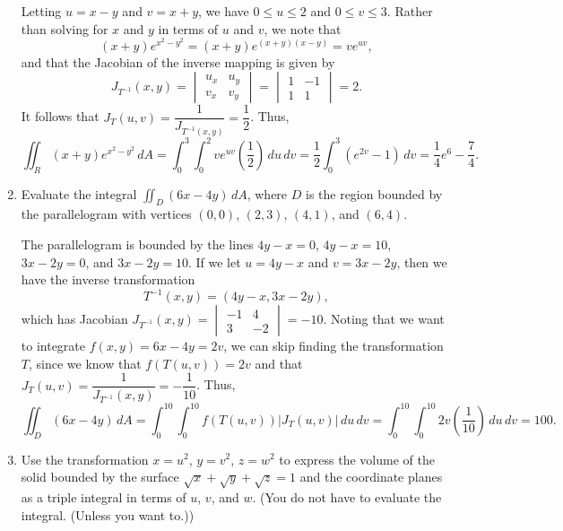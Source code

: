 \documentclass[letterpaper,12pt]{article}
\newcommand{\di}{\displaystyle}
\begin{document}
\begin{enumerate}
\bigskip

Letting $u=x-y$ and $v=x+y$, we have $0\leq u\leq 2$ and $0\leq v\leq 3$. Rather than solving for $x$ and $y$ in terms of $u$ and $v$, we note that
\[
 (x+y)e^{x^2-y^2} = (x+y)e^{(x+y)(x-y)} = ve^{uv},
\]
and that the Jacobian of the inverse mapping is given by
\[
 J_{T^{-1}}(x,y) = \begin{vmatrix} u_x&u_y\\v_x&v_y\end{vmatrix} = \begin{vmatrix} 1&-1\\1&1\end{vmatrix} = 2.
\]
It follows that $J_T(u,v) = \dfrac{1}{J_{T^{-1}(x,y)}} = \dfrac{1}{2}$. Thus,
\[
 \iint_R (x+y)e^{x^2-y^2}\,dA = \int_0^3\int_0^2 ve^{uv}\left(\frac{1}{2}\right)\,du\,dv = \frac{1}{2}\int_0^3(e^{2v}-1)\,dv = \frac{1}{4}e^6-\frac{7}{4}.
\]


\item Evaluate the integral $\di \iint_D(6x-4y)\,dA$, where $D$ is the region bounded by the parallelogram with vertices $(0,0)$, $(2,3)$, $(4,1)$, and $(6,4)$.

\bigskip

The parallelogram is bounded by the lines $4y-x=0$, $4y-x=10$, $3x-2y=0$, and  $3x-2y=10$. If we let $u=4y-x$ and $v=3x-2y$, then we have the inverse transformation
\[
 T^{-1}(x,y) = (4y-x, 3x-2y),
\]
which has Jacobian $J_{T^{-1}}(x,y) = \begin{vmatrix}-1&4\\3&-2\end{vmatrix} = -10$. Noting that we want to integrate $f(x,y)=6x-4y = 2v$, we can skip finding the transformation $T$, since we know that $f(T(u,v))=2v$ and that $J_T(u,v) = \dfrac{1}{J_{T^{-1}}(x,y)} = -\dfrac{1}{10}$. Thus,
\[
 \iint_D(6x-4y)\,dA = \int_0^{10}\int_0^{10}f(T(u,v))\lvert J_T(u,v)\rvert\,du\,dv = \int_0^{10}\int_0^{10}2v\left(\frac{1}{10}\right)\,du\,dv = 100.
\]


\item Use the transformation $x=u^2$, $y=v^2$, $z=w^2$ to express the volume of the solid bounded by the surface $\sqrt{x}+\sqrt{y}+\sqrt{z}=1$ and the coordinate planes as a triple integral in terms of $u$, $v$, and $w$. (You do not have to evaluate the integral. (Unless you want to.))

\bigskip


\end{enumerate}
\end{document}
